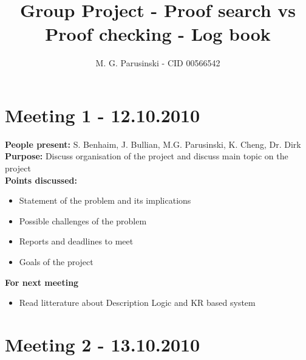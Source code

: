\documentclass[12pt]{article}
\title{Group Project - Proof search vs Proof checking - Log book}
\author{M. G. Parusinski - CID 00566542}
\begin{document}
\maketitle

\section*{Meeting 1 - 12.10.2010} 

\textbf{People present:} S. Benhaim, J. Bullian, M.G. Parusinski, K. Cheng, Dr. Dirk \\
\textbf{Purpose:} Discuss organisation of the project and discuss main topic on the project \\
\textbf{Points discussed:}
\begin{itemize}
\item Statement of the problem and its implications
\item Possible challenges of the problem
\item Reports and deadlines to meet
\item Goals of the project
\end{itemize} 
\textbf{For next meeting}
\begin{itemize}
\item Read litterature about Description Logic and KR based system
\end{itemize}

\section*{Meeting 2 - 13.10.2010}
\end{document}
